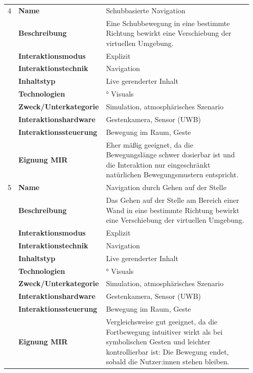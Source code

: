 \begin{longtable}{p{0.03\linewidth} p{0.27\linewidth}
    >{\raggedright\arraybackslash}p{0.65\linewidth}}
    4  & \textbf{Name} & Schubbasierte Navigation \\
        & \textbf{Beschreibung} & Eine Schubbewegung in eine bestimmte Richtung bewirkt eine Verschiebung der virtuellen Umgebung. \\
        & \textbf{Interaktionsmodus} & Explizit \\
        & \textbf{Interaktionstechnik} & Navigation \\
        & \textbf{Inhaltstyp} & Live gerenderter Inhalt \\
        & \textbf{Technologien} & 270° Visuals \\
        & \textbf{Zweck/Unterkategorie} & Simulation, atmosphärisches Szenario \\
        & \textbf{Interaktionshardware} & Gestenkamera, Sensor (UWB) \\
        & \textbf{Interaktionssteuerung} & Bewegung im Raum, Geste \\
        & \textbf{Eignung MIR} & Eher mäßig geeignet, da die Bewegungslänge schwer dosierbar ist und die Interaktion nur eingeschränkt natürlichen Bewegungsmustern entspricht. \\
        \midrule

    5  & \textbf{Name} & Navigation durch Gehen auf der Stelle \\
        & \textbf{Beschreibung} & Das Gehen auf der Stelle am Bereich einer Wand in eine bestimmte Richtung bewirkt eine Verschiebung der virtuellen Umgebung. \\
        & \textbf{Interaktionsmodus} & Explizit \\
        & \textbf{Interaktionstechnik} & Navigation \\
        & \textbf{Inhaltstyp} & Live gerenderter Inhalt \\
        & \textbf{Technologien} & 270° Visuals \\
        & \textbf{Zweck/Unterkategorie} & Simulation, atmosphärisches Szenario \\
        & \textbf{Interaktionshardware} & Gestenkamera, Sensor (UWB) \\
        & \textbf{Interaktionssteuerung} & Bewegung im Raum, Geste \\
        & \textbf{Eignung MIR} & Vergleichsweise gut geeignet, da die Fortbewegung intuitiver wirkt als bei symbolischen Gesten und leichter kontrollierbar ist: Die Bewegung endet, sobald die Nutzer:innen stehen bleiben. \\
        \midrule


\end{longtable}
